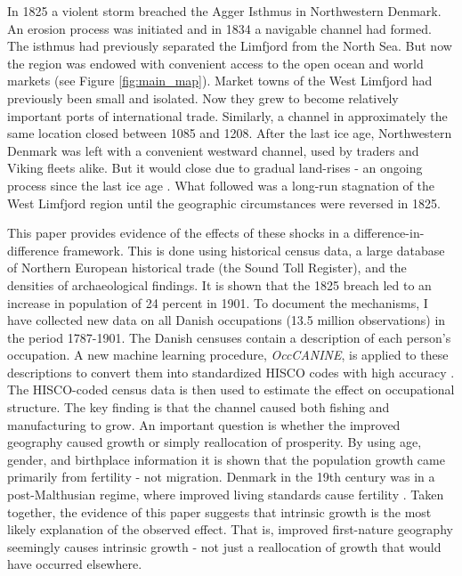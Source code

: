\documentclass[11pt]{article}
\begin{document}
In 1825 a violent storm breached the Agger Isthmus in Northwestern Denmark. An erosion process was initiated and in 1834 a navigable channel had formed. The isthmus had previously separated the Limfjord from the North Sea. But now the region was endowed with convenient access to the open ocean and world markets (see Figure \ref{fig:main_map}). Market towns of the West Limfjord had previously been small and isolated. Now they grew to become relatively important ports of international trade. Similarly, a channel in approximately the same location closed between 1085 and 1208. After the last ice age, Northwestern Denmark was left with a convenient westward channel, used by traders and Viking fleets alike. But it would close due to gradual land-rises - an ongoing process since the last ice age \citep{Christensen2004}. What followed was a long-run stagnation of the West Limfjord region until the geographic circumstances were reversed in 1825.

This paper provides evidence of the effects of these shocks in a difference-in-difference framework. This is done using historical census data, a large database of Northern European historical trade (the Sound Toll Register), and the densities of archaeological findings. It is shown that the 1825 breach led to an increase in population of 24 percent in 1901. To document the mechanisms, I have collected new data on all Danish occupations (13.5 million observations) in the period 1787-1901. The Danish censuses contain a description of each person's occupation. A new machine learning procedure, \textit{OccCANINE}, is applied to these descriptions to convert them into standardized HISCO codes with high accuracy \citep{leeuwen2002hisco, dahl2024breaking}. The HISCO-coded census data is then used to estimate the effect on occupational structure. The key finding is that the channel caused both fishing and manufacturing to grow. An important question is whether the improved geography caused growth or simply reallocation of prosperity. By using age, gender, and birthplace information it is shown that the population growth came primarily from fertility - not migration. Denmark in the 19th century was in a post-Malthusian regime, where improved living standards cause fertility \citep{Jensen2022, Galor2011}. Taken together, the evidence of this paper suggests that intrinsic growth is the most likely explanation of the observed effect. That is, improved first-nature geography seemingly causes intrinsic growth - not just a reallocation of growth that would have occurred elsewhere.
\end{document}
